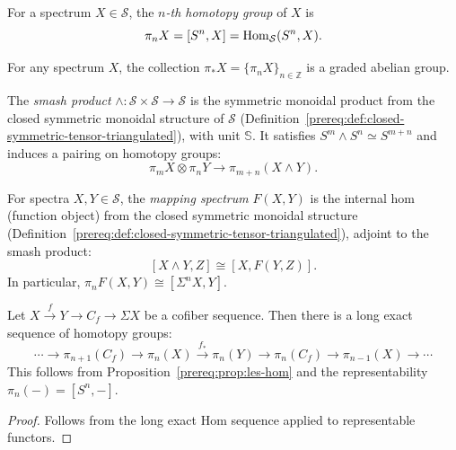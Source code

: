 \begin{definition}\label{prereq:def:homotopy-groups}
    \leanok
    For a spectrum $X \in \mathcal{S}$, the \emph{$n$-th homotopy group} of $X$ is
    $$\pi_n X = [S^n, X] = \mathrm{Hom}_{\mathcal{S}}(S^n, X).$$
\end{definition}

\begin{proposition}\label{prereq:prop:homotopy-graded-abelian}
    \leanok
    For any spectrum $X$, the collection $\pi_* X = \{\pi_n X\}_{n \in \mathbb{Z}}$ is a graded abelian group.
\end{proposition}

\begin{definition}\label{prereq:def:smash-product}
    \leanok
    The \emph{smash product} $\wedge: \mathcal{S} \times \mathcal{S} \to \mathcal{S}$ is the symmetric monoidal product from the closed symmetric monoidal structure of $\mathcal{S}$ (Definition~\ref{prereq:def:closed-symmetric-tensor-triangulated}), with unit $\mathbb{S}$. It satisfies $S^m \wedge S^n \simeq S^{m+n}$ and induces a pairing on homotopy groups:
    $$\pi_m X \otimes \pi_n Y \to \pi_{m+n}(X \wedge Y).$$
\end{definition}

\begin{definition}\label{prereq:def:mapping-spectra}
    \leanok
    For spectra $X, Y \in \mathcal{S}$, the \emph{mapping spectrum} $F(X, Y)$ is the internal hom (function object) from the closed symmetric monoidal structure (Definition~\ref{prereq:def:closed-symmetric-tensor-triangulated}), adjoint to the smash product:
    $$[X \wedge Y, Z] \cong [X, F(Y, Z)].$$
    In particular, $\pi_n F(X, Y) \cong [\Sigma^n X, Y]$.
\end{definition}

\begin{proposition}\label{prereq:prop:les-homotopy}
    \leanok
    Let $X \xrightarrow{f} Y \to C_f \to \Sigma X$ be a cofiber sequence. Then there is a long exact sequence of homotopy groups:
    $$\cdots \to \pi_{n+1}(C_f) \to \pi_n(X) \xrightarrow{f_*} \pi_n(Y) \to \pi_n(C_f) \to \pi_{n-1}(X) \to \cdots$$
    This follows from Proposition~\ref{prereq:prop:les-hom} and the representability $\pi_n(-) = [S^n, -]$.
\end{proposition}
\begin{proof}\leanok Follows from the long exact Hom sequence applied to representable functors.\end{proof}

